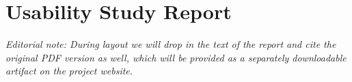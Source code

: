 \chapter{Usability Study Report}
\label{appendix:usability_study}

\begin{center}
  \emph{Editorial note: During layout we will drop in the text of the
    report and cite the original PDF version as well, which will be
    provided as a separately downloadable artifact on the project
    website.}
\end{center}

